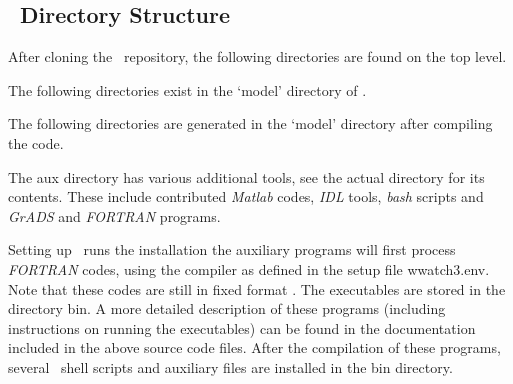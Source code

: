 \vssub
\subsection{~Directory Structure}
\vssub

After cloning the \ws\ repository, the following directories are found on the 
top level. 

\begin{dlist}
\end{dlist}

\noindent The following directories exist in the `model' directory of \ws.
 
\begin{dlist}
\end{dlist}

\noindent The following directories are generated in the `model' directory 
after compiling the code. 

\begin{dlist}
\end{dlist}

\noindent

The  {\dir aux} directory has various additional tools, see the actual directory
for its contents. These include contributed {\it Matlab} codes, 
{\it IDL} tools, {\it bash} scripts and {\it GrADS} and {\it FORTRAN} programs.

Setting up \ws\ runs the installation the auxiliary programs will first process 
{\it FORTRAN} codes,
using the compiler as defined in the setup file {\file wwatch3.env}. 
Note that these codes are still in fixed format {}. The 
executables are stored in the directory {\dir bin}. A more detailed
description of these programs (including instructions on running the
executables) can be found in the documentation included in the above source
code files. After the compilation of these programs, several \unix\ shell
scripts and auxiliary files are installed in the {\dir bin} directory.

\begin{flist}


\end{flist}

